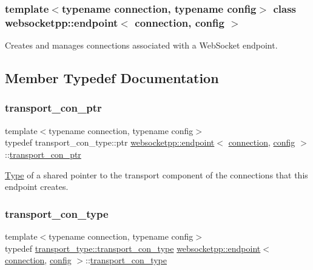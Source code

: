 \subsubsection*{template$<$typename connection, typename config$>$\newline
class websocketpp\+::endpoint$<$ connection, config $>$}

Creates and manages connections associated with a Web\+Socket endpoint. 

\subsection{Member Typedef Documentation}
\mbox{\label{classwebsocketpp_1_1endpoint_a22be3833280c548d724298eba0f00b2a}} 
\subsubsection{\texorpdfstring{transport\+\_\+con\+\_\+ptr}{transport\_con\_ptr}}
{\footnotesize\ttfamily template$<$typename connection, typename config$>$ \\
typedef transport\+\_\+con\+\_\+type\+::ptr \mbox{\hyperlink{classwebsocketpp_1_1endpoint}{websocketpp\+::endpoint}}$<$ \mbox{\hyperlink{classwebsocketpp_1_1connection}{connection}}, \mbox{\hyperlink{classconfig}{config}} $>$\+::\mbox{\hyperlink{classwebsocketpp_1_1endpoint_a22be3833280c548d724298eba0f00b2a}{transport\+\_\+con\+\_\+ptr}}}

\mbox{\hyperlink{struct_type}{Type}} of a shared pointer to the transport component of the connections that this endpoint creates. \mbox{\label{classwebsocketpp_1_1endpoint_aaec9d745cafcee505c63efff421e3dff}} 
\subsubsection{\texorpdfstring{transport\+\_\+con\+\_\+type}{transport\_con\_type}}
{\footnotesize\ttfamily template$<$typename connection, typename config$>$ \\
typedef \mbox{\hyperlink{classwebsocketpp_1_1transport_1_1asio_1_1endpoint_a75f3102766fd3ba8230e99a2b0e00457}{transport\+\_\+type\+::transport\+\_\+con\+\_\+type}} \mbox{\hyperlink{classwebsocketpp_1_1endpoint}{websocketpp\+::endpoint}}$<$ \mbox{\hyperlink{classwebsocketpp_1_1connection}{connection}}, \mbox{\hyperlink{classconfig}{config}} $>$\+::\mbox{\hyperlink{classwebsocketpp_1_1endpoint_aaec9d745cafcee505c63efff421e3dff}{transport\+\_\+con\+\_\+type}}}

